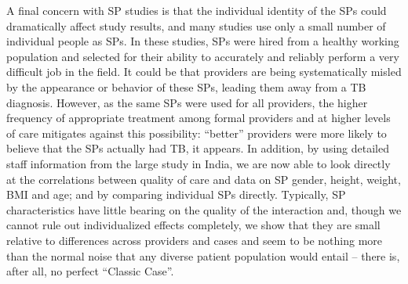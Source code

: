 \documentclass[fleqn,10pt]{wlscirep}
\begin{document}
A final concern with SP studies is that the individual identity of the SPs could dramatically affect study results, and many studies use only a small number of individual people as SPs. In these studies, SPs were hired from a healthy working population and selected for their ability to accurately and reliably perform a very difficult job in the field. It could be that providers are being systematically misled by the appearance or behavior of these SPs, leading them away from a TB diagnosis. However, as the same SPs were used for all providers, the higher frequency of appropriate treatment among formal providers and at higher levels of care mitigates against this possibility: ``better'' providers were more likely to believe that the SPs actually had TB, it appears. In addition, by using detailed staff information from the large study in India, we are now able to look directly at the correlations between quality of care and data on SP gender, height, weight, BMI and age; and by comparing individual SPs directly. Typically, SP characteristics have little bearing on the quality of the interaction and, though we cannot rule out individualized effects completely, we show that they are small relative to differences across providers and cases and seem to be nothing more than the normal noise that any diverse patient population would entail -- there is, after all, no perfect ``Classic Case''.
\end{document}
